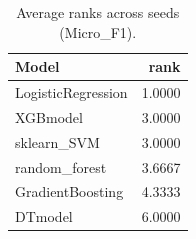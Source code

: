 \begin{table}[t]
\centering
\begin{tabular}{lr}
\toprule
Model & rank \\
\midrule
LogisticRegression & 1.0000 \\
XGBmodel & 3.0000 \\
sklearn_SVM & 3.0000 \\
random_forest & 3.6667 \\
GradientBoosting & 4.3333 \\
DTmodel & 6.0000 \\
\bottomrule
\end{tabular}
\caption{Average ranks across seeds (Micro_F1).}
\label{tab:avg_rank_Micro_F1}
\end{table}